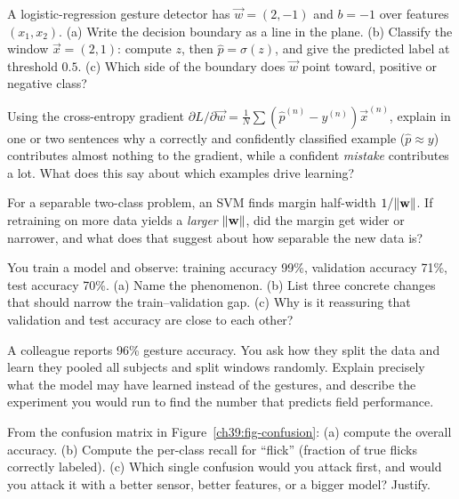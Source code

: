 \begin{exercise}
A logistic-regression gesture detector has $\vec{w}=(2,-1)$ and $b=-1$ over features
$(x_1,x_2)$. (a) Write the decision boundary as a line in the plane. (b) Classify the
window $\vec{x}=(2,1)$: compute $z$, then $\hat{p}=\sigma(z)$, and give the predicted
label at threshold $0.5$. (c) Which side of the boundary does $\vec{w}$ point toward,
positive or negative class?
\end{exercise}

\begin{exercise}
Using the cross-entropy gradient
$\partial L/\partial\vec{w}=\tfrac1N\sum(\hat{p}^{(n)}-y^{(n)})\vec{x}^{(n)}$, explain in
one or two sentences why a correctly and confidently classified example
($\hat{p}\approx y$) contributes almost nothing to the gradient, while a confident
\emph{mistake} contributes a lot. What does this say about which examples drive learning?
\end{exercise}

\begin{exercise}
For a separable two-class problem, an SVM finds margin half-width $1/\lVert\mathbf{w}\rVert$. If
retraining on more data yields a \emph{larger} $\lVert\mathbf{w}\rVert$, did the margin get wider
or narrower, and what does that suggest about how separable the new data is?
\end{exercise}

\begin{exercise}
You train a model and observe: training accuracy 99\%, validation accuracy 71\%, test
accuracy 70\%. (a) Name the phenomenon. (b) List three concrete changes that should
narrow the train--validation gap. (c) Why is it reassuring that validation and test
accuracy are close to each other?
\end{exercise}

\begin{exercise}
A colleague reports 96\% gesture accuracy. You ask how they split the data and learn they
pooled all subjects and split windows randomly. Explain precisely what the model may have
learned instead of the gestures, and describe the experiment you would run to find the
number that predicts field performance.
\end{exercise}

\begin{exercise}
From the confusion matrix in Figure~\ref{ch39:fig-confusion}: (a) compute the overall
accuracy. (b) Compute the per-class recall for ``flick'' (fraction of true flicks
correctly labeled). (c) Which single confusion would you attack first, and would you
attack it with a better sensor, better features, or a bigger model? Justify.
\end{exercise}


